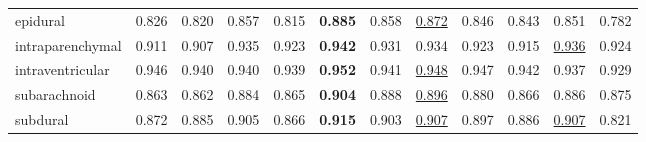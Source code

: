\begin{minipage}{\textwidth}
{\begin{tabular}{@{}lccccccccccc@{}}
epidural & 0.826 & 0.820 & 0.857 & 0.815 & \textbf{0.885} & 0.858 & \underline{0.872} & 0.846 & 0.843 & 0.851 & 0.782 \\
intraparenchymal & 0.911 & 0.907 & 0.935 & 0.923 & \textbf{0.942} & 0.931 & 0.934 & 0.923 & 0.915 & \underline{0.936} & 0.924 \\
intraventricular & 0.946 & 0.940 & 0.940 & 0.939 & \textbf{0.952} & 0.941 & \underline{0.948} & 0.947 & 0.942 & 0.937 & 0.929 \\
subarachnoid & 0.863 & 0.862 & 0.884 & 0.865 & \textbf{0.904} & 0.888 & \underline{0.896} & 0.880 & 0.866 & 0.886 & 0.875 \\
subdural & 0.872 & 0.885 & 0.905 & 0.866 & \textbf{0.915} & 0.903 & \underline{0.907} & 0.897 & 0.886 & \underline{0.907} & 0.821 \\
\bottomrule
\end{tabular}
}\end{minipage}
\par\bigskip
